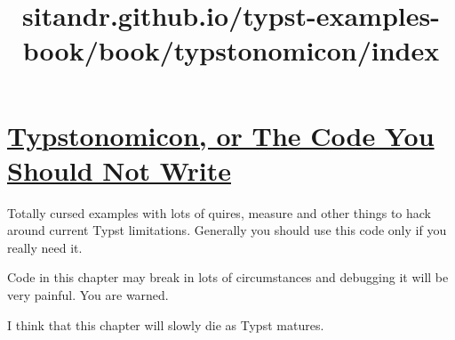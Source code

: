\title{sitandr.github.io/typst-examples-book/book/typstonomicon/index}

\section{\texorpdfstring{\hyperref[typstonomicon-or-the-code-you-should-not-write]{Typstonomicon,
or The Code You Should Not
Write}}{Typstonomicon, or The Code You Should Not Write}}\label{typstonomicon-or-the-code-you-should-not-write}

Totally cursed examples with lots of quires, measure and other things to
hack around current Typst limitations. Generally you should use this
code only if you really need it.

Code in this chapter may break in lots of circumstances and debugging it
will be very painful. You are warned.

I think that this chapter will slowly die as Typst matures.
